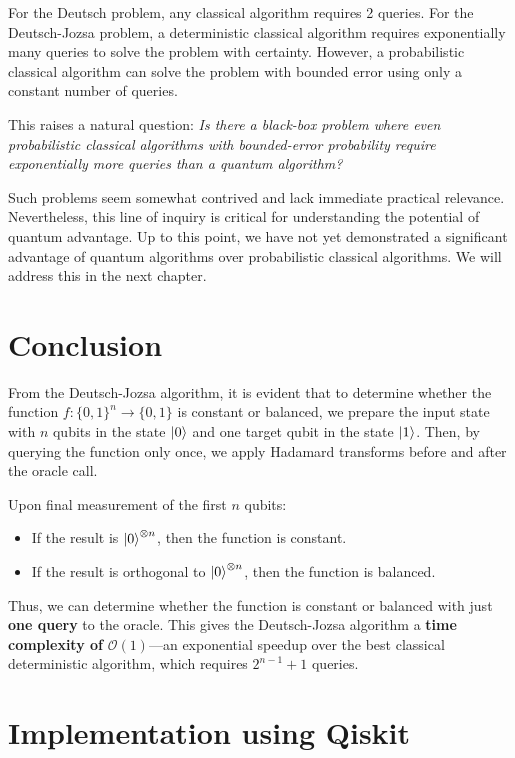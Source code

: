 For the Deutsch problem, any classical algorithm requires 2 queries. For the Deutsch-Jozsa problem, a deterministic classical algorithm requires exponentially many queries to solve the problem with certainty. However, a probabilistic classical algorithm can solve the problem with bounded error using only a constant number of queries.

This raises a natural question: \emph{Is there a black-box problem where even probabilistic classical algorithms with bounded-error probability require exponentially more queries than a quantum algorithm?}

Such problems seem somewhat contrived and lack immediate practical relevance. Nevertheless, this line of inquiry is critical for understanding the potential of quantum advantage. Up to this point, we have not yet demonstrated a significant advantage of quantum algorithms over probabilistic classical algorithms. We will address this in the next chapter.

\section{Conclusion}

From the Deutsch-Jozsa algorithm, it is evident that to determine whether the function $f:\{0,1\}^n \rightarrow \{0,1\}$ is constant or balanced, we prepare the input state with $n$ qubits in the state $\ket{0}$ and one target qubit in the state $\ket{1}$. Then, by querying the function only once, we apply Hadamard transforms before and after the oracle call.

Upon final measurement of the first $n$ qubits:
\begin{itemize}
    \item If the result is $\ket{0}^{\otimes n}$, then the function is constant.
    \item If the result is orthogonal to $\ket{0}^{\otimes n}$, then the function is balanced.
\end{itemize}

Thus, we can determine whether the function is constant or balanced with just \textbf{one query} to the oracle. This gives the Deutsch-Jozsa algorithm a \textbf{time complexity of} $\mathcal{O}(1)$—an exponential speedup over the best classical deterministic algorithm, which requires $2^{n-1} + 1$ queries.

\section{Implementation using Qiskit}
